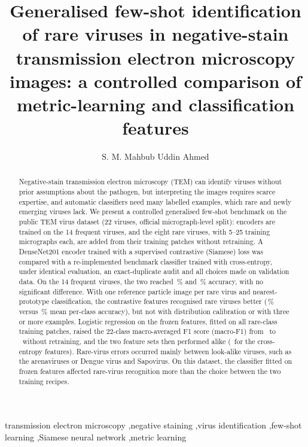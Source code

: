 \documentclass[preprint,review,12pt]{elsarticle}
\begin{document}
\begin{frontmatter}

\title{Generalised few-shot identification of rare viruses in negative-stain transmission electron microscopy images: a controlled comparison of metric-learning and classification features}

\author[a]{S. M. Mahbub Uddin Ahmed}

\begin{abstract}
Negative-stain transmission electron microscopy (TEM) can identify viruses without prior assumptions about the pathogen, but interpreting the images requires scarce expertise, and automatic classifiers need many labelled examples, which rare and newly emerging viruses lack. We present a controlled generalised few-shot benchmark on the public TEM virus dataset (22 viruses, official micrograph-level split): encoders are trained on the 14 frequent viruses, and the eight rare viruses, with 5--25 training micrographs each, are added from their training patches without retraining. A DenseNet201 encoder trained with a supervised contrastive (Siamese) loss was compared with a re-implemented benchmark classifier trained with cross-entropy, under identical evaluation, an exact-duplicate audit and all choices made on validation data. On the 14 frequent viruses, the two reached \SiamClosedAccMean\,\% and \BOneClosedAccMean\,\% accuracy, with no significant difference. With one reference particle image per rare virus and nearest-prototype classification, the contrastive features recognised rare viruses better (\KshotSiamOneMean\,\% versus \KshotBOneOneMean\,\% mean per-class accuracy), but not with distribution calibration or with three or more examples. Logistic regression on the frozen features, fitted on all rare-class training patches, raised the 22-class macro-averaged F1 score (macro-F1) from \SiamGfslFOneMean\ to \SiamLrFOneMean\ without retraining, and the two feature sets then performed alike (\BOneLrFOneMean\ for the cross-entropy features). Rare-virus errors occurred mainly between look-alike viruses, such as the arenaviruses or Dengue virus and Sapovirus. On this dataset, the classifier fitted on frozen features affected rare-virus recognition more than the choice between the two training recipes.
\end{abstract}

\begin{keyword}
transmission electron microscopy \sep negative staining \sep virus identification \sep few-shot learning \sep Siamese neural network \sep metric learning
\end{keyword}

\end{frontmatter}
\end{document}
